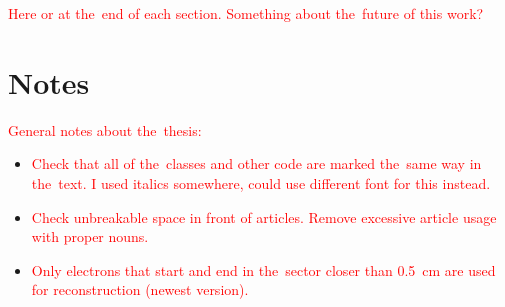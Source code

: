 	\textcolor{red}{Here or at the~end of each section. Something about the~future of this work?}
	
	\section*{Notes}
		\textcolor{red}{General notes about the~thesis:}
		\begin{itemize}
			\item \textcolor{red}{Check that all of the~classes and other code are marked the~same way in the~text. I used italics somewhere, could use different font for this instead.}
			\item \textcolor{red}{Check unbreakable space in front of articles. Remove excessive article usage with proper nouns.}
			\item \textcolor{red}{Only electrons that start and end in the~sector closer than 0.5~cm are used for reconstruction (newest version).}
		\end{itemize}